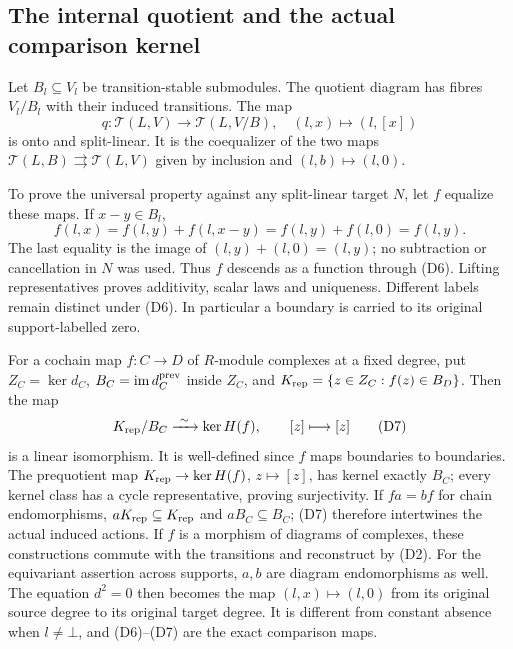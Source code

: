 \subsection{The internal quotient and the actual comparison kernel}
Let \(B_l\subseteq V_l\) be transition-stable submodules. The
quotient diagram has fibres \(V_l/B_l\) with their induced
transitions. The map
\[
 q:\mathcal T(L,V)\to\mathcal T(L,V/B),\quad(l,x)\mapsto(l,[x])
 \tag{D6}
\]
is onto and split-linear. It is the coequalizer of the two
maps \(\mathcal T(L,B)\rightrightarrows\mathcal T(L,V)\)
given by inclusion and \((l,b)\mapsto(l,0)\).

To prove the universal property against any split-linear target
\(N\), let \(f\) equalize these maps. If \(x-y\in B_l\),
\[
 f(l,x)=f(l,y)+f(l,x-y)=f(l,y)+f(l,0)=f(l,y).
\]
The last equality is the image of \((l,y)+(l,0)=(l,y)\);
no subtraction or cancellation in \(N\) was used.
Thus \(f\) descends as a function through (D6).
Lifting representatives proves additivity, scalar laws and
uniqueness. Different labels remain distinct under (D6).
In particular a boundary is carried to its original
support-labelled zero.

For a cochain map \(f:C\to D\) of \(R\)-module complexes at a
fixed degree, put \(Z_C=\ker d_C\), \(B_C=\operatorname{im}d_C^{\rm prev}\)
inside \(Z_C\), and
\(K_{\rm rep}=\{z\in Z_C:f(z)\in B_D\}\).
Then the map
\[
 K_{\rm rep}/B_C\xrightarrow{\ \sim\ }\ker H(f),\qquad
             [z]\longmapsto[z]
 \tag{D7}
\]
is a linear isomorphism. It is well-defined since \(f\) maps
boundaries to boundaries. The prequotient map
\(K_{\rm rep}\to\ker H(f)\), \(z\mapsto[z]\), has kernel exactly
\(B_C\); every kernel class has a cycle representative,
proving surjectivity. If \(fa=bf\) for chain endomorphisms,
\(aK_{\rm rep}\subseteq K_{\rm rep}\) and \(aB_C\subseteq B_C\);
(D7) therefore intertwines the actual induced actions.
If \(f\) is a morphism of diagrams of complexes, these constructions
commute with the transitions and reconstruct by (D2). For the
equivariant assertion across supports, \(a,b\) are diagram
endomorphisms as well.
The equation \(d^2=0\) then becomes the map
\((l,x)\mapsto(l,0)\) from its original source degree to its
original target degree. It is different from constant absence
when \(l\neq\bot\), and (D6)--(D7) are the exact comparison maps.

